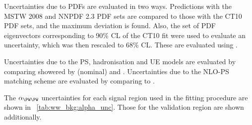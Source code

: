 Uncertainties due to \acp{PDF} are evaluated in two ways. Predictions with the MSTW 2008 
\cite{MSTW} and NNPDF 2.3 \cite{NNPDF} PDF sets are compared to those with the CT10 
\cite{CTEQ} PDF sets, and the maximum deviation is found. Also, the set of PDF 
eigenvectors corresponding to 90\% \ac{CL} of the CT10 fit were used to evaluate an 
uncertainty, which was then rescaled to 68\% \ac{CL}. These are evaluated using \amcatnlo.

Uncertainties due to the \ac{PS}, hadronisation and \ac{UE} models are evaluated by 
comparing \powhegbox showered by  (nominal) and \fherwig. 
Uncertainties due to the NLO-PS matching scheme are evaluated by comparing 
\meps{\powhegbox}{\fherwig} to \meps{\amcatnlo}{\fherwig}.

The $\alpha_{\WW}$ uncertainties for each signal region used in the fitting procedure are 
shown in \Table~\ref{tab:ww_bkg:alpha_unc}. Those for the validation region are shown 
additionally.


